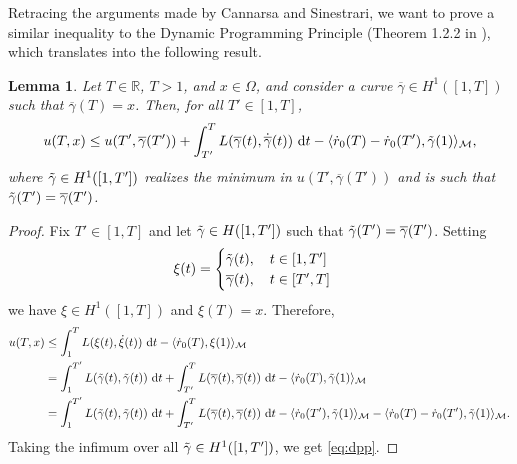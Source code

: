 \documentclass[a4paper,10pt]{amsart}
\newcommand{\numberset}{\mathbb}
\newcommand{\R}{\numberset{R}}
\newcommand{\ud}{\mathrm{d}}
\theoremstyle{plain}
\newtheorem{lem}[thm]{Lemma}
\theoremstyle{definition}
\numberwithin{equation}{section}
\numberwithin{thm}{section}
\begin{document}
    Retracing the arguments made by Cannarsa and Sinestrari, we want to prove a similar inequality to the Dynamic Programming Principle (Theorem 1.2.2 in \cite{MR2041617}), which translates into the following result.
\begin{lem}
\label{lem:DDP}
    Let $T\in\R$, $T>1$, and $x\in{\Omega}$, and consider a curve $\overline{\gamma}\in H^1([1,T])$ such that $\overline{\gamma}(T)=x$. Then, for all $T'\in[1,T]$,
    \begin{equation}\label{eq:dpp}
        u(T,x) \leq u(T',\overline{\gamma}(T')) + \int_{T'}^{T} L(\overline{\gamma}(t),\dot{\overline{\gamma}}(t))\ \ud t - \langle\dot{r}_0(T)-\dot{r}_0(T'),\Tilde{\gamma}(1)\rangle_\mathcal{M},
    \end{equation}
    where $\Tilde{\gamma}\in H^1([1,T'])$ realizes the minimum in $u(T',\overline{\gamma}(T'))$ and is such that $\Tilde{\gamma}(T')=\overline{\gamma}(T')$.
\end{lem}
\begin{proof}
    Fix $T'\in[1,T]$ and let $\Tilde{\gamma}\in H([1,T'])$ such that $\Tilde{\gamma}(T') = \overline{\gamma}(T')$. Setting
    \[
    \xi(t)=\begin{cases}
        \Tilde{\gamma}(t),\quad t\in[1,T']\\
        \overline{\gamma}(t),\quad t\in[T',T]
    \end{cases}
    \]
    we have $\xi\in H^1([1,T])$ and $\xi(T)=x$. Therefore,
    \[\begin{split}
    u(T,x) &\leq \int_{1}^{T}L(\xi(t),\dot{\xi}(t))\ \ud t - \langle\dot{r}_0(T),\xi(1)\rangle_\mathcal{M}\\
    &=\int_{1}^{T'}L(\Tilde{\gamma}(t),\Tilde{\gamma}(t))\ \ud t + \int_{T'}^{T}L(\overline{\gamma}(t),\overline{\gamma}(t))\ \ud t - \langle\dot{r}_0(T),\Tilde{\gamma}(1)\rangle_\mathcal{M}\\
    &=\int_{1}^{T'}L(\Tilde{\gamma}(t),\Tilde{\gamma}(t))\ \ud t + \int_{T'}^{T}L(\overline{\gamma}(t),\overline{\gamma}(t))\ \ud t - \langle\dot{r}_0(T'),\Tilde{\gamma}(1)\rangle_\mathcal{M} - \langle\dot{r}_0(T)-\dot{r}_0(T'),\Tilde{\gamma}(1)\rangle_\mathcal{M}.
    \end{split}\]
    Taking the infimum over all $\Tilde{\gamma}\in H^1([1,T'])$, we get \eqref{eq:dpp}.    
\end{proof}
\end{document}
